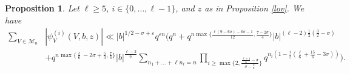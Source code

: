 \documentclass[12pt]{amsart}
\newtheorem{proposition}[theorem]{Proposition}
\begin{document}
 \begin{proposition}
Let $\ell \geq 5$, $i \in \{0,\ldots, \ell-1\}$, and $z$ as in Proposition  \ref{lov}. We have
\begin{align*}
\sum_{V \in \mathcal{M}_n} & |\psi^{(i)}_V(V,b,z)|   \ll |b|^{1/2-\sigma+\varepsilon} q^{\varepsilon n} \Big(q^n +q^{ n \max\{ \frac{\ell(9-6\sigma)-6\sigma-1}{12} , \frac{7-2\sigma}{4} \}} |b|^{(\ell-2)\frac{1}{2} (\frac{3}{2}-\sigma)}\\
& +q^{n \max\{ \frac{\ell}{6}-2\sigma+\frac{5}{3}, \frac{7}{6} \}} |b|^{\frac{\ell-2}{6}} \sum_{n_1+\ldots+\ell n_{\ell}=n}  \prod_{i \geq \max\{2, \frac{ \frac{\ell+1}{6} -\sigma}{\sigma-\frac{2}{3}} \}} q^{n_i (1-\frac{i}{2} ( \frac{\ell}{6} +\frac{15}{6}-3\sigma))}  \Big).
\end{align*}



 \end{proposition}
 
\end{document}
